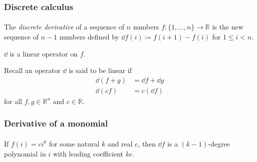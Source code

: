 \documentclass{beamer}                             %
\newcommand*{\defeq}{\coloneqq}
\begin{document}
\begin{frame}
\frametitle{Discrete calculus}
\framesubtitle{}

\begin{definition}
  The \emph{discrete derivative} of a sequence of \( n \) numbers \( f: \{ 1,
  \dotsc, n \} \to \mathbb{R} \) is the new sequence of \( n - 1 \) numbers
  defined by \( \dd f(i) \defeq f(i + 1) - f(i) \) for \( 1 \leq i < n \).
\end{definition}
\begin{theorem}
  \( \dd \) is a linear operator on \( f \).
\end{theorem}
\begin{lemma}
  Recall an operator \( \dd \) is said to be linear if
  \begin{align*}
    \dd(f + g) &= \dd f + \dd g \\
    \dd(c f) &= c (\dd f)
  \end{align*}
  for all \( f, g \in \mathbb{R}^n \) and \( c \in \mathbb{R} \).
\end{lemma}
\end{frame}

\begin{frame}
\frametitle{Derivative of a monomial}
\framesubtitle{}

\begin{lemma}
  If \( f(i) = c i^k \) for some natural \( k \) and real
  \( c \), then \( \dd f \) is a \( (k - 1) \)-degree
  polynomial in \( i \) with leading coefficient \( k c \).
\end{lemma}
\end{frame}
\end{document}
